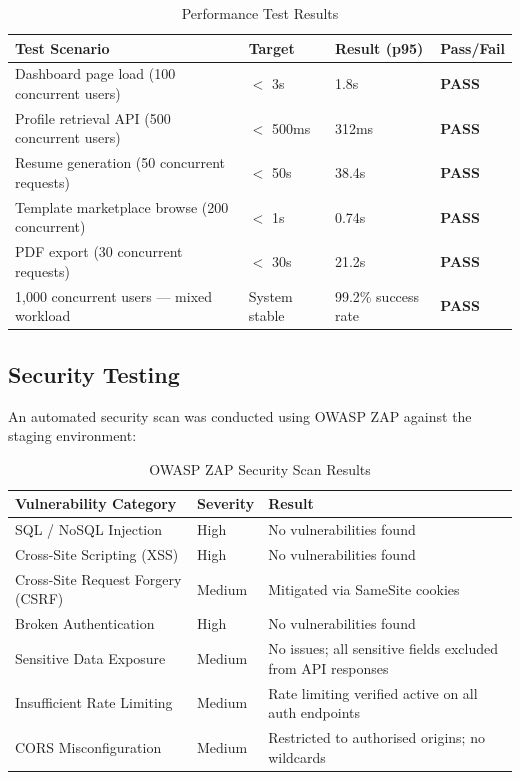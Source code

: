 \documentclass[12pt, a4paper, oneside]{report}
\begin{document}
\begin{table}[H]
\centering
\caption{Performance Test Results}
\label{tab:perf_results}
\renewcommand{\arraystretch}{1.4}
\begin{tabularx}{\textwidth}{|X|p{2.5cm}|p{2.5cm}|p{2cm}|}
\hline
\textbf{Test Scenario} & \textbf{Target} & \textbf{Result (p95)} & \textbf{Pass/Fail} \\
\hline
Dashboard page load (100 concurrent users) & $<$ 3s & 1.8s & \textbf{PASS} \\
\hline
Profile retrieval API (500 concurrent users) & $<$ 500ms & 312ms & \textbf{PASS} \\
\hline
Resume generation (50 concurrent requests) & $<$ 50s & 38.4s & \textbf{PASS} \\
\hline
Template marketplace browse (200 concurrent) & $<$ 1s & 0.74s & \textbf{PASS} \\
\hline
PDF export (30 concurrent requests) & $<$ 30s & 21.2s & \textbf{PASS} \\
\hline
1,000 concurrent users --- mixed workload & System stable & 99.2\% success rate & \textbf{PASS} \\
\hline
\end{tabularx}
\end{table}

\subsection{Security Testing}

An automated security scan was conducted using OWASP ZAP \cite{owasp2021} against the staging environment:

\begin{table}[H]
\centering
\caption{OWASP ZAP Security Scan Results}
\label{tab:security_results}
\renewcommand{\arraystretch}{1.4}
\begin{tabularx}{\textwidth}{|p{5cm}|p{2cm}|X|}
\hline
\textbf{Vulnerability Category} & \textbf{Severity} & \textbf{Result} \\
\hline
SQL / NoSQL Injection & High & No vulnerabilities found \\
\hline
Cross-Site Scripting (XSS) & High & No vulnerabilities found \\
\hline
Cross-Site Request Forgery (CSRF) & Medium & Mitigated via SameSite cookies \\
\hline
Broken Authentication & High & No vulnerabilities found \\
\hline
Sensitive Data Exposure & Medium & No issues; all sensitive fields excluded from API responses \\
\hline
Insufficient Rate Limiting & Medium & Rate limiting verified active on all auth endpoints \\
\hline
CORS Misconfiguration & Medium & Restricted to authorised origins; no wildcards \\
\hline
\end{tabularx}
\end{table}
\end{document}
